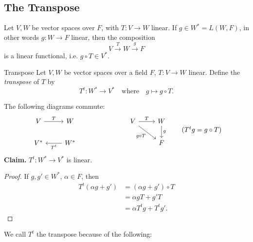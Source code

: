 \documentclass[class=article, crop=false]{standalone}
\begin{document}
  \subsection{The Transpose}
  Let $V,W$ be vector spaces over $F$, with $T\colon V\to W$ linear. If $g\in W^* = L(W, F)$, in other words $g\colon W\to F$ linear, then the composition
  \[
    V\xrightarrow{T}W\xrightarrow{g}F
  \]
  is a linear functional, i.e. $g\circ T\in V^*$.
  \begin{definition}{Transpose}
    Let $V, W$ be vector spaces over a field $F$, $T\colon V\to W$ linear. Define the \emph{transpose} of $T$ by
    \[
      T^t\colon W^*\to V^* \quad \text{where}\quad g\mapsto g\circ T. \tag{$T^tg\ceq g\circ T$ for all $g\in W^*$}
    \]
  \end{definition}
  The following diagrams commute:
  \[\begin{tikzcd}
    V & W \\
    {V^*} & {W^*}
    \arrow["{T^t}", from=2-2, to=2-1]
    \arrow["T", from=1-1, to=1-2]
  \end{tikzcd}
  \hspace{1in}
  \begin{tikzcd}
    V & W \\
    & F
    \arrow["g", from=1-2, to=2-2]
    \arrow["T", from=1-1, to=1-2]
    \arrow["{g\circ T}"', from=1-1, to=2-2]
  \end{tikzcd}\tag{$T^tg = g\circ T$}\]
  \textbf{Claim.} $T^t\colon W^*\to V^*$ is linear.
  \begin{proof}
    If $g, g'\in W^*$, $\alpha\in F$, then
    \begin{align*}
      T^t(\alpha g + g') &= (\alpha g + g')\circ T \\
                         &= \alpha gT + g'T \\
                         &= \alpha T^tg + T^tg'.
    \end{align*}
  \end{proof}
  We call $T^t$ the transpose because of the following:
\end{document}
